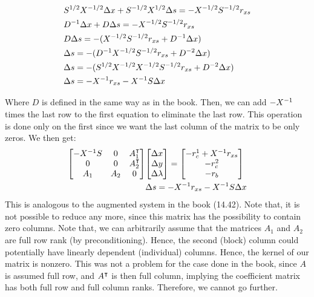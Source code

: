 \begin{solution}
\begin{align*}
        &S^{1/2} X^{-1/2} \Delta x + S^{-1/2} X^{1/2} \Delta s = -X^{-1/2} S^{-1/2} r_{xs}\\
        &D^{-1} \Delta x + D \Delta s = -X^{-1/2} S^{-1/2} r_{xs}\\
        &D \Delta s = -( X^{-1/2} S^{-1/2} r_{xs} + D^{-1} \Delta x) \\
        &\Delta s = -(D^{-1} X^{-1/2} S^{-1/2} r_{xs} + D^{-2}\Delta x)\\
        &\Delta s = -(S^{1/2} X^{-1/2} X^{-1/2} S^{-1/2}  r_{xs} + D^{-2}\Delta x)\\
        &\Delta s = -X^{-1} r_{xs} - X^{-1} S \Delta x
    \end{align*}
    \alignbreak

    Where $D$ is defined in the same way as in the book. Then, we can add $-X^{-1}$ times the last row to the first equation to eliminate the last row. This operation is done only on the first since we want the last column of the matrix to be only zeros. We then get:
    \begin{align*}
        \mqty[-X\inv S &0 &A_1\T \\ 0&0&A_2\T\\A_1&A_2&0]&\mqty[\Delta x\\\Delta y\\ \Delta \lm] = \mqty[-r_c^1 + X\inv r_{xs}\\ -r_c^2\\-r_b]\\
        &\Delta s = -X\inv r_{xs} - X\inv S\Delta x 
    \end{align*}
    This is analogous to the augmented system in the book (14.42). Note that, it is not possible to reduce any more, since this matrix has the possibility to contain zero columns. Note that, we can arbitrarily assume that the matrices $A_1$ and $A_2$ are full row rank (by preconditioning). Hence, the second (block) column could potentially have linearly dependent (individual) columns. Hence, the kernel of our matrix is nonzero. This was not a problem for the case done in the book, since $A$ is assumed full row, and $A^{\intercal}$ is then full column, implying the coefficient matrix has both full row and full column ranks. Therefore, we cannot go further. 

\end{solution}
